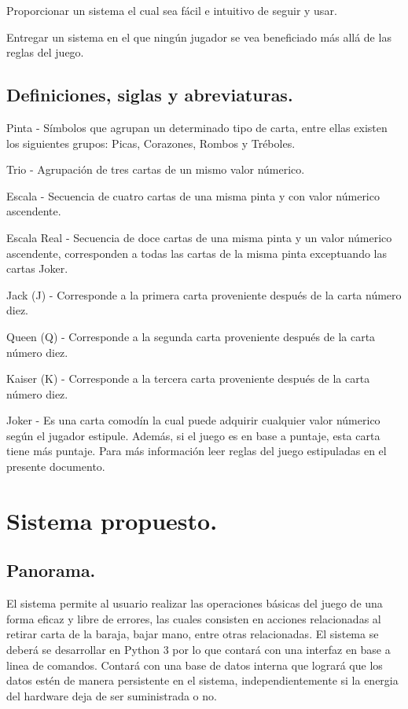 \documentclass[60pt]{article}
\begin{document}
Proporcionar un sistema el cual sea fácil e intuitivo de seguir y usar.

Entregar un sistema en el que ningún jugador se vea beneficiado más allá de las reglas del juego.
\subsection{Definiciones, siglas y abreviaturas.}\label{cap:definiciones}
Pinta - Símbolos que agrupan un determinado tipo de carta, entre ellas existen los siguientes grupos: Picas, Corazones, Rombos y Tréboles.

Trio - Agrupación de tres cartas de un mismo valor númerico.

Escala - Secuencia de cuatro cartas de una misma pinta y con valor númerico ascendente.

Escala Real - Secuencia de doce cartas de una misma pinta y un valor númerico ascendente, corresponden a todas las cartas de la misma pinta exceptuando las cartas Joker.

Jack (J) - Corresponde a la primera carta proveniente después de la carta número diez.

Queen (Q) - Corresponde a la segunda carta proveniente después de la carta número diez.

Kaiser (K) - Corresponde a la tercera carta proveniente después de la carta número diez.

Joker - Es una carta comodín la cual puede adquirir cualquier valor númerico según el jugador estipule. Además, si el juego es en base a puntaje, esta carta tiene más puntaje. Para más información leer reglas del juego estipuladas en el presente documento.
\section{Sistema propuesto.}\label{cap:sistema}
\subsection{Panorama.}\label{cap:panorama}
El sistema permite al usuario realizar las operaciones básicas del juego de una forma eficaz y libre de errores, las cuales consisten en acciones relacionadas al retirar carta de la baraja, bajar mano, entre otras relacionadas. El sistema se deberá se desarrollar en Python 3 por lo que contará con una interfaz en base a linea de comandos. Contará con una base de datos interna que logrará que los datos estén de manera persistente en el sistema, independientemente si la energia del hardware deja de ser suministrada o no.
\end{document}
